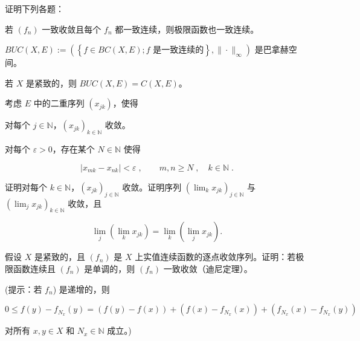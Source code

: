 \begin{exercises}
\item

证明下列各题：

\begin{items}
\item

若 $ (f_{n}) $ 一致收敛且每个 $ f_{n} $ 都一致连续，则极限函数也一致连续。

\item

$ BUC(X, E) := \left( \left\{ f \in BC(X, E) ; f \text{ 是一致连续的} \right\} , \|\cdot\|_\infty \right) $ 是巴拿赫空间。

\item

若 $ X $ 是紧致的，则 $ BUC(X,E)=C(X,E) $。

\end{items}

\item

考虑 $ E $ 中的二重序列 $ (x_{jk}) $，使得

\begin{subitems}
\item

对每个 $ j \in \mathbb{N} $，$ (x_{jk})_{k \in \mathbb{N}} $ 收敛。

\item

对每个 $ \varepsilon > 0 $，存在某个 $ N \in \mathbb{N} $ 使得

\[
|x_{m k}-x_{n k}|<\varepsilon\;,\qquad m,n\ge N\;,\quad k\in\mathbb{N}\;.
\]

证明对每个 $k\in\mathbb{N}$，$(x_{jk})_{j\in\mathbb{N}}$ 收敛。证明序列 $(\lim_{k}x_{jk})_{j\in\mathbb{N}}$ 与 $(\lim_{j}x_{jk})_{k\in\mathbb{N}}$ 收敛，且

\[
\lim_{j}(\lim_{k}x_{jk})=\lim_{k}(\lim_{j}x_{jk}).
\]
\end{subitems}

\item

假设 $X$ 是紧致的，且 $(f_n)$ 是 $X$ 上实值连续函数的逐点收敛序列。证明：若极限函数连续且 $(f_n)$ 是单调的，则 $(f_n)$ 一致收敛（迪尼定理）。

(提示：若 $ f_{n} $) 是递增的，则

\[
0\leq f(y)-f_{N_{x}}(y)=\left(f(y)-f(x)\right)+\left(f(x)-f_{N_{x}}(x)\right)+\left(f_{N_{x}}(x)-f_{N_{x}}(y)\right)
\]

对所有 $ x, y \in X $ 和 $ N_x \in \mathbb{N} $ 成立。)


\end{exercises}
